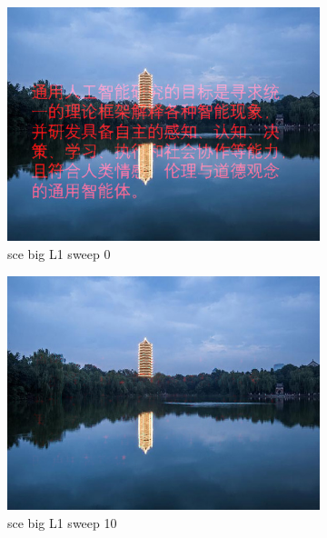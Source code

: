 \documentclass[11pt]{article}
\begin{document}
\begin{figure}[ht!]
    \centering
    \hfill%
    \begin{subfigure}[]{0.333\linewidth}
        \centering
        \includegraphics[width=\linewidth]{fig/restoration/sce_big/L1/gibbs_0.jpg}
        \caption{sce big L1 sweep 0}
    \end{subfigure}%
    \hfill%
    \begin{subfigure}[]{0.333\linewidth}
        \centering
        \includegraphics[width=\linewidth]{fig/restoration/sce_big/L1/gibbs_10.jpg}
        \caption{sce big L1 sweep 10}
    \end{subfigure}%
    \hfill%
    \begin{subfigure}[]{0.333\linewidth}

\end{subfigure}
\end{figure}
\end{document}
